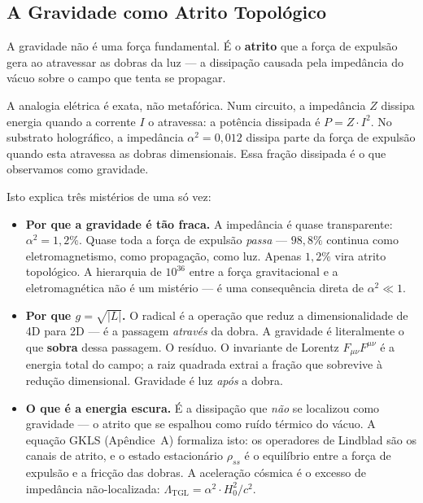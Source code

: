 \documentclass[12pt,a4paper,twoside]{article}
\newcommand{\alphaii}{\alpha^{2}}
\begin{document}
\subsection{A Gravidade como Atrito Topol\'ogico}

A gravidade n\~ao \'e uma for\c{c}a fundamental. \'E o \textbf{atrito} que a for\c{c}a de expuls\~ao gera ao atravessar as dobras da luz --- a dissipa\c{c}\~ao causada pela imped\^ancia do v\'acuo sobre o campo que tenta se propagar.

A analogia el\'etrica \'e exata, n\~ao metaf\'orica. Num circuito, a imped\^ancia $Z$ dissipa energia quando a corrente $I$ o atravessa: a pot\^encia dissipada \'e $P = Z \cdot I^2$. No substrato hologr\'afico, a imped\^ancia $\alphaii = 0{,}012$ dissipa parte da for\c{c}a de expuls\~ao quando esta atravessa as dobras dimensionais. Essa fra\c{c}\~ao dissipada \'e o que observamos como gravidade.

Isto explica tr\^es mist\'erios de uma s\'o vez:

\begin{itemize}[nosep]
\item \textbf{Por que a gravidade \'e t\~ao fraca.} A imped\^ancia \'e quase transparente: $\alphaii = 1{,}2\%$. Quase toda a for\c{c}a de expuls\~ao \textit{passa} --- $98{,}8\%$ continua como eletromagnetismo, como propaga\c{c}\~ao, como luz. Apenas $1{,}2\%$ vira atrito topol\'ogico. A hierarquia de $10^{36}$ entre a for\c{c}a gravitacional e a eletromagn\'etica n\~ao \'e um mist\'erio --- \'e uma consequ\^encia direta de $\alphaii \ll 1$.

\item \textbf{Por que $g = \sqrt{|L|}$.} O radical \'e a opera\c{c}\~ao que reduz a dimensionalidade de 4D para 2D --- \'e a passagem \textit{atrav\'es} da dobra. A gravidade \'e literalmente o que \textbf{sobra} dessa passagem. O res\'iduo. O invariante de Lorentz $F_{\mu\nu}F^{\mu\nu}$ \'e a energia total do campo; a raiz quadrada extrai a fra\c{c}\~ao que sobrevive \`a redu\c{c}\~ao dimensional. Gravidade \'e luz \textit{ap\'os} a dobra.

\item \textbf{O que \'e a energia escura.} \'E a dissipa\c{c}\~ao que \textit{n\~ao} se localizou como gravidade --- o atrito que se espalhou como ru\'ido t\'ermico do v\'acuo. A equa\c{c}\~ao GKLS (Ap\^endice~A) formaliza isto: os operadores de Lindblad s\~ao os canais de atrito, e o estado estacion\'ario $\rho_{ss}$ \'e o equil\'ibrio entre a for\c{c}a de expuls\~ao e a fric\c{c}\~ao das dobras. A acelera\c{c}\~ao c\'osmica \'e o excesso de imped\^ancia n\~ao-localizada: $\Lambda_{\text{TGL}} = \alphaii \cdot H_0^2 / c^2$.
\end{itemize}
\end{document}
